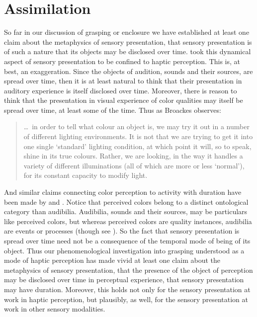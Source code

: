 \section{Assimilation} %
\label{sec:assimilation}

So far in our discussion of grasping or enclosure we have established at least one claim about the metaphysics of sensory presentation, that sensory presentation is of such a nature that its objects may be disclosed over time. \citet{Broad:1952kx} took this dynamical aspect of sensory presentation to be confined to haptic perception. This is, at best, an exaggeration. Since the objects of audition, sounds and their sources, are spread over time, then it is at least natural to think that their presentation in auditory experience is itself disclosed over time. Moreover, there is reason to think that the presentation in visual experience of color qualities may itself be spread over time, at least some of the time. Thus as Broackes observes: 
\begin{quote}
	\ldots\ in order to tell what colour an object is, we may try it out in a number of different lighting environments. It is not that we are trying to get it into one single `standard' lighting condition, at which point it will, so to speak, shine in its true colours. Rather, we are looking, in the way it handles a variety of different illuminations (all of which are more or less `normal'), for its constant capacity to modify light. \citep[215]{Broackes:1997pa}
\end{quote}
And similar claims connecting color perception to activity with duration have been made by \citet{Noe:2004fk} and \citet{Matthen:2005md}. Notice that perceived colors belong to a distinct ontological category than audibilia. Audibilia, sounds and their sources, may be particulars like perceived colors, but whereas perceived colors are quality instances, audibilia are events or processes (though see \citealt{Pasnau:2009ys}). So the fact that sensory presentation is spread over time need not be a consequence of the temporal mode of being of its object. Thus our phenomenological investigation into grasping understood as a mode of haptic perception has made vivid at least one claim about the metaphysics of sensory presentation, that the presence of the object of perception may be disclosed over time in perceptual experience, that sensory presentation may have duration. Moreover, this holds not only for the sensory presentation at work in haptic perception, but plausibly, as well, for the sensory presentation at work in other sensory modalities.

